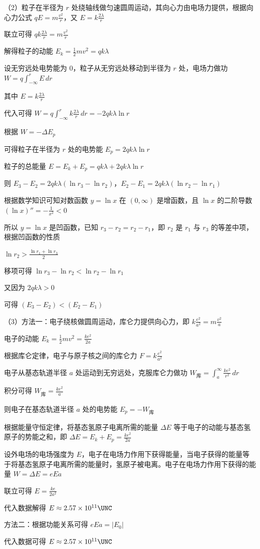 \documentclass[\gkver]{gaokaozhenti}
\begin{document}
\begin{enumerate}
{（2）粒子在半径为 $r$ 处绕轴线做匀速圆周运动，其向心力由电场力提供，根据向心力公式 $qE = m\frac{v^{2}}{r}$，又 $E = k\frac{2\lambda}{r}$

联立可得 $qk\frac{2\lambda}{r} = m\frac{v^{2}}{r}$

解得粒子的动能 $E_{k} = \frac{1}{2}mv^{2} = qk\lambda$

设无穷远处电势能为 0，粒子从无穷远处移动到半径为 $r$ 处，电场力做功 $W = q\int_{-\infty}^{r} E \, dr$

其中 $E = k\frac{2\lambda}{r}$

代入可得 $W = q\int_{-\infty}^{r} k\frac{2\lambda}{r} \, dr = -2qk\lambda\ln r$

根据 $W = -\Delta E_{p}$

可得粒子在半径为 $r$ 处的电势能 $E_{p} = 2qk\lambda\ln r$

粒子的总能量 $E = E_{k} + E_{p} = qk\lambda + 2qk\lambda\ln r$

则 $E_{3} - E_{2} = 2qk\lambda(\ln r_{3} - \ln r_{2})$，$E_{2} - E_{1} = 2qk\lambda(\ln r_{2} - \ln r_{1})$

根据数学知识可知对数函数 $y = \ln x$ 在 $(0, \infty)$ 是增函数，且 $\ln x$ 的二阶导数 $(\ln x)'' = -\frac{1}{x^{2}} < 0$

所以 $y = \ln x$ 是凹函数，已知 $r_{3} - r_{2} = r_{2} - r_{1}$，即 $r_{2}$ 是 $r_{1}$ 与 $r_{3}$ 的等差中项，根据凹函数的性质

$\ln r_{2} > \frac{\ln r_{1} + \ln r_{3}}{2}$

移项可得 $\ln r_{3} - \ln r_{2} < \ln r_{2} - \ln r_{1}$

又因为 $2qk\lambda > 0$

可得 $(E_{3} - E_{2}) < (E_{2} - E_{1})$

（3）方法一：电子绕核做圆周运动，库仑力提供向心力，即 $k\frac{e^{2}}{a^{2}} = m\frac{v^{2}}{a}$

电子的动能 $E_{k} = \frac{1}{2}mv^{2} = \frac{ke^{2}}{2a}$

根据库仑定律，电子与原子核之间的库仑力 $F = k\frac{e^{2}}{a^{2}}$

电子从基态轨道半径 $a$ 处运动到无穷远处，克服库仑力做功 $W_{\text{库}} = \int_{a}^{\infty} \frac{ke^{2}}{r^{2}} \, dr$

积分可得 $W_{\text{库}} = \frac{ke^{2}}{a}$

则电子在基态轨道半径 $a$ 处的电势能 $E_{p} = -W_{\text{库}}$

根据能量守恒定律，将基态氢原子电离所需的能量 $\Delta E$ 等于电子的动能与基态氢原子的势能之和，即 $\Delta E = E_{k} + E_{p} = \frac{ke^{2}}{2a}$

设外电场的电场强度为 $E$，电子在电场力作用下获得能量，当电子获得的能量等于将基态氢原子电离所需的能量时，氢原子被电离。电子在电场力作用下获得的能量 $W = \Delta E = eEa$

联立可得 $E = \frac{ke}{2a^{2}}$

代入数据解得 $E \approx 2.57 \times 10^{11} \UNC$

方法二：根据功能关系可得 $eEa = |E_{0}|$

代入数据可得 $E \approx 2.57 \times 10^{11} \UNC$
}

\end{enumerate}
\end{document}
